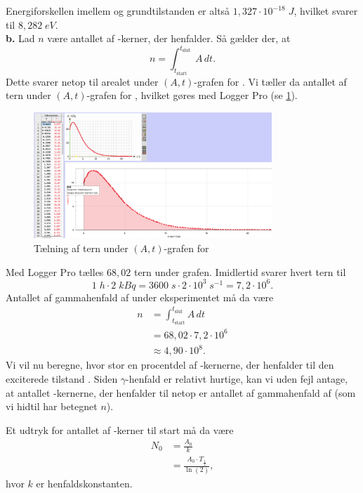 \documentclass{report}
\begin{document}
Energiforskellen imellem  og grundtilstanden er altså $1,327 \cdot 10 ^{-18} \;\unit{J}$, hvilket svarer til $8,282 \;\unit{eV}$.\\[1ex]
\textbf{b.}
Lad $n$ være antallet af -kerner, der henfalder.
Så gælder der, at 
\[
n=\int_{t _{\text{start} }}^{t _{\text{slut} }} A \,dt. 
\] 
Dette svarer netop til arealet under $(A,t)$-grafen for .
Vi tæller da antallet af tern under $(A,t)$-grafen for , hvilket gøres med Logger Pro (se \cref{fig:ternAt}).
\begin{figure}[H]
\begin{center}
  \includegraphics[width=0.8\textwidth]{ternAt.png}
\end{center}
  \caption{Tælning af tern under $(A,t)$-grafen for }
\label{fig:ternAt}
\end{figure}
Med Logger Pro tælles $68,02$ tern under grafen. 
Imidlertid svarer hvert tern til
\[
1 \;\unit{h} \cdot 2 \;\unit{kBq} = 3600 \;\unit{s} \cdot 2 \cdot 10^3 \;\unit{s ^{-1}} = 7,2 \cdot 10 ^{6}.
\] 
Antallet af gammahenfald af  under eksperimentet må da være
\begin{equation*}
\begin{split}
  n&=\int_{t _{\text{start} }}^{t _{\text{slut} }} A \,dt\\
  &=68,02 \cdot 7,2 \cdot 10^6\\
  &\approx 4,90 \cdot 10^8.
\end{split}
\end{equation*}
Vi vil nu beregne, hvor stor en procentdel af -kernerne, der henfalder til den exciterede tilstand .
Siden $\gamma $-henfald er relativt hurtige, kan vi uden fejl antage, at antallet -kernerne, der henfalder til  netop er antallet af gammahenfald af  (som vi hidtil har betegnet $n$).

Et udtryk for antallet af -kerner til start må da være
\begin{equation*}
\begin{split}
  N_0&= \frac{A_0}{k} \\
  &=\frac{A_0 \cdot T _{\frac{1}{2}}}{\ln\left(2\right) },
\end{split}
\end{equation*}
hvor $k$ er henfaldskonstanten.
\end{document}
